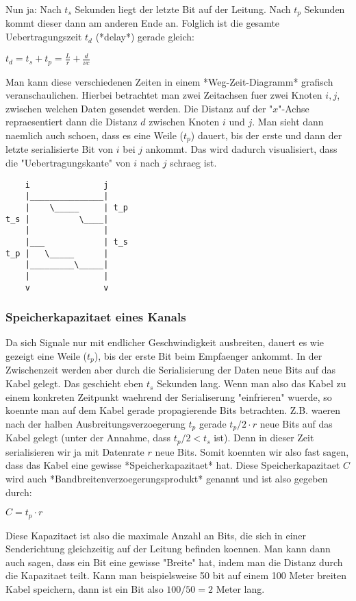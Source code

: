 Nun ja: Nach $t_s$ Sekunden liegt der letzte Bit auf der Leitung. Nach $t_p$
Sekunden kommt dieser dann am anderen Ende an. Folglich ist die gesamte
Uebertragungszeit $t_d$ (*delay*) gerade gleich:

$t_d = t_s + t_p = \frac{L}{r} + \frac{d}{\nu c}$

Man kann diese verschiedenen Zeiten in einem *Weg-Zeit-Diagramm* grafisch
veranschaulichen. Hierbei betrachtet man zwei Zeitachsen fuer zwei Knoten $i,
j$, zwischen welchen Daten gesendet werden. Die Distanz auf der "$x$"-Achse
repraesentiert dann die Distanz $d$ zwischen Knoten $i$ und $j$. Man sieht dann
naemlich auch schoen, dass es eine Weile ($t_p$) dauert, bis der erste und dann
der letzte serialisierte Bit von $i$ bei $j$ ankommt. Das wird dadurch
visualisiert, dass die "Uebertragungskante" von $i$ nach $j$ schraeg ist.

\begin{verbatim}
    i               j
    |_______________|
    |    \_____     | t_p
t_s |          \____|
    |               |
    |___            | t_s
t_p |   \_____      |
    |_________\_____|
    |               |
    v               v
\end{verbatim}

\subsubsection{Speicherkapazitaet eines Kanals} 

Da sich Signale nur mit endlicher Geschwindigkeit ausbreiten, dauert es wie
gezeigt eine Weile ($t_p$), bis der erste Bit beim Empfaenger ankommt. In der
Zwischenzeit werden aber durch die Serialisierung der Daten neue Bits auf das
Kabel gelegt. Das geschieht eben $t_s$ Sekunden lang. Wenn man also das Kabel zu
einem konkreten Zeitpunkt waehrend der Serialiserung "einfrieren" wuerde, so
koennte man auf dem Kabel gerade propagierende Bits betrachten. Z.B. waeren nach
der halben Ausbreitungsverzoegerung $t_p$ gerade $t_p/2 \cdot r$ neue Bits auf
das Kabel gelegt (unter der Annahme, dass $t_p/2 < t_s$ ist). Denn in dieser
Zeit serialisieren wir ja mit Datenrate $r$ neue Bits. Somit koennten wir also
fast sagen, dass das Kabel eine gewisse *Speicherkapazitaet* hat. Diese
Speicherkapazitaet $C$ wird auch *Bandbreitenverzoegerungsprodukt* genannt und
ist also gegeben durch:

$C = t_p \cdot r$

Diese Kapazitaet ist also die maximale Anzahl an Bits, die sich in einer
Senderichtung gleichzeitig auf der Leitung befinden koennen. Man kann dann auch
sagen, dass ein Bit eine gewisse "Breite" hat, indem man die Distanz durch die
Kapazitaet teilt. Kann man beispielsweise 50 bit auf einem 100 Meter breiten
Kabel speichern, dann ist ein Bit also $100 / 50 = 2$ Meter lang.

